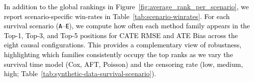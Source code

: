\documentclass{article} %
\newcommand{\rebuttal}[1]{\textcolor{black}{#1}}
\begin{document}
\rebuttal{In addition to the global rankings in Figure~\ref{fig:average_rank_per_scenario}, we report scenario-specific win-rates in Table~\ref{tab:scenario-winrates}. For each survival scenario (\texttt{A}--\texttt{E}), we compute how often each method family appears in the Top-1, Top-3, and Top-5 positions for CATE RMSE and ATE Bias across the eight causal configurations. This provides a complementary view of robustness, highlighting which families consistently occupy the top ranks as we vary the survival time model (Cox, AFT, Poisson) and the censoring rate (low, medium, high; Table~\ref{tab:synthetic-data-survival-scenario}).}
\end{document}
